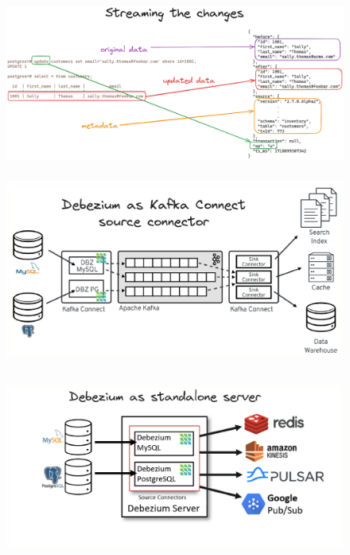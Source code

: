 \documentclass[10pt,utf8]{beamer}
\begin{document}
\begin{frame}
    \begin{figure}
        \centering
        \includegraphics[height=5.5cm]{./img/update_data.eps}
    \end{figure}
\end{frame}

\begin{frame}
    \begin{figure}
        \centering
        \includegraphics[height=6cm]{./img/debezium_kafka.eps}
    \end{figure}
\end{frame}    
    
\begin{frame}
    \begin{figure}
        \centering
        \includegraphics[height=6cm]{./img/debezium_server.eps}
    \end{figure}
\end{frame}    
\end{document}

